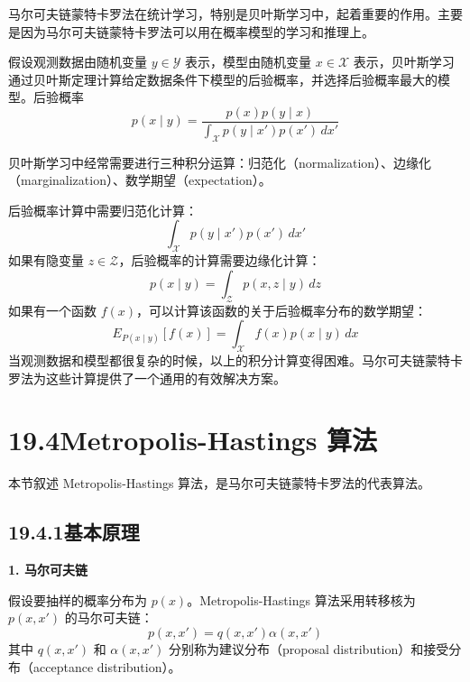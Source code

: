 \documentclass[UTF8, 12pt, fontset=fandol, oneside]{ctexart}
\begin{document}
马尔可夫链蒙特卡罗法在统计学习，特别是贝叶斯学习中，起着重要的作用。主要是因为马尔可夫链蒙特卡罗法可以用在概率模型的学习和推理上。

假设观测数据由随机变量 $y\in\mathcal{Y}$ 表示，模型由随机变量 $x\in\mathcal{X}$ 表示，贝叶斯学习通过贝叶斯定理计算给定数据条件下模型的后验概率，并选择后验概率最大的模型。后验概率
\begin{equation}
p(x\mid y)=\frac{p(x)p(y\mid x)}{\displaystyle\int_{\mathcal{X}}p(y\mid x')p(x')\,dx'}
\tag{19.34}
\end{equation}

贝叶斯学习中经常需要进行三种积分运算：归范化（normalization）、边缘化（marginalization）、数学期望（expectation）。

后验概率计算中需要归范化计算：
\begin{equation}
\int_{\mathcal{X}}p(y\mid x')p(x')\,dx'
\tag{19.35}
\end{equation}
如果有隐变量 $z\in\mathcal{Z}$，后验概率的计算需要边缘化计算：
\begin{equation}
p(x\mid y)=\int_{\mathcal{Z}}p(x,z\mid y)\,dz
\tag{19.36}
\end{equation}
如果有一个函数 $f(x)$，可以计算该函数的关于后验概率分布的数学期望：
\begin{equation}
E_{P(x\mid y)}[f(x)]=\int_{\mathcal{X}}f(x)p(x\mid y)\,dx
\tag{19.37}
\end{equation}
当观测数据和模型都很复杂的时候，以上的积分计算变得困难。马尔可夫链蒙特卡罗法为这些计算提供了一个通用的有效解决方案。

\section*{19.4\quad Metropolis-Hastings 算法}

本节叙述 Metropolis-Hastings 算法，是马尔可夫链蒙特卡罗法的代表算法。

\subsection*{19.4.1\quad 基本原理}

\noindent\textbf{1. 马尔可夫链}

假设要抽样的概率分布为 $p(x)$。Metropolis-Hastings 算法采用转移核为 $p(x,x')$ 的马尔可夫链：
\begin{equation}
p(x,x')=q(x,x')\alpha(x,x')
\tag{19.38}
\end{equation}
其中 $q(x,x')$ 和 $\alpha(x,x')$ 分别称为建议分布（proposal distribution）和接受分布（acceptance distribution）。
\end{document}
